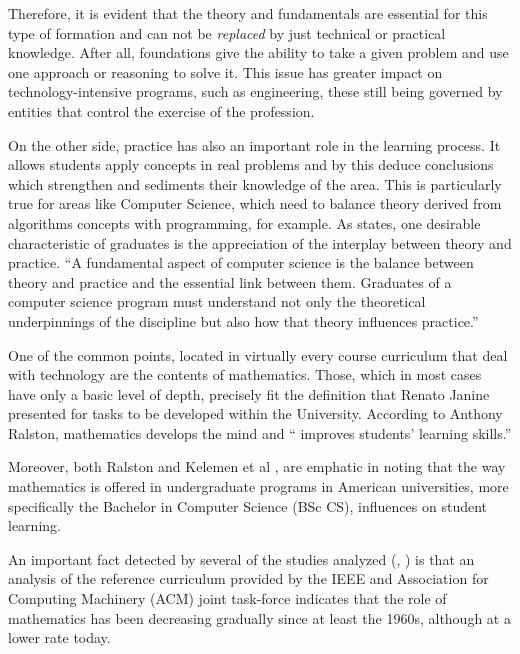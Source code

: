 \documentclass[conference]{IEEEtran}
\begin{document}
	Therefore, it is evident that the theory and fundamentals are essential for this type of formation and can not be \emph{replaced} by just technical or practical knowledge. After all, foundations give the ability to take a given problem and use one approach or reasoning to solve it. This issue has greater impact on technology-intensive programs, such as engineering, these still being governed by entities that control the exercise of the profession.

	On the other side, practice has also an important role in the learning process. It allows students apply concepts in real problems and by this deduce conclusions which strengthen and sediments their knowledge of the area. This is particularly true for areas like Computer Science, which need to balance theory derived from algorithms concepts with programming, for example. As \cite{cs2008} states, one desirable characteristic of graduates is the appreciation of the interplay between theory and practice. ``A fundamental aspect of computer science is the balance between theory and practice and the essential link between them. Graduates of a computer science program must understand not only the theoretical underpinnings of the discipline but also how that theory
influences practice.''

	One of the common points, located in virtually every course curriculum that deal with technology are the contents of mathematics. Those, which in most cases have only a basic level of depth, precisely fit the definition that Renato Janine presented for tasks to be developed within the University. According to Anthony Ralston, mathematics develops the mind and `` improves students' learning skills.'' \cite{ralston:do_need_mathematics}

	Moreover, both Ralston and Kelemen et al \cite{kelemen:has_become_math_phobic}, are emphatic in noting that the way mathematics is offered in undergraduate programs in American universities, more specifically the Bachelor in Computer Science (BSc CS), influences on student learning.

	An important fact detected by several of the studies analyzed (\cite{ralston:do_need_mathematics}, \cite{tucker:our_curriculum_math_phobic}) is that an analysis of the reference curriculum provided by the IEEE and Association for Computing Machinery (ACM) joint task-force \cite{cs2001} \cite{cs2008} indicates that the role of mathematics has been decreasing gradually since at least the 1960s, although at a lower rate today.
\end{document}
